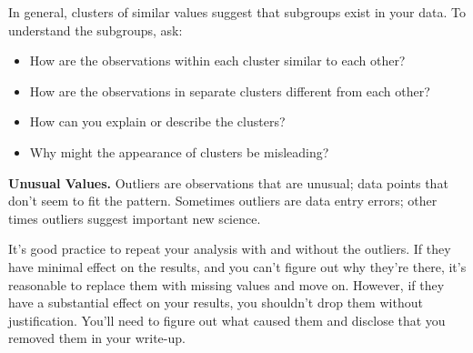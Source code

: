 \documentclass{article}
\begin{document}
In general, clusters of similar values suggest that subgroups exist in your data. To understand the subgroups, ask:

\begin{itemize}
	\item How are the observations within each cluster similar to each other?
	\item How are the observations in separate clusters different from each other?
	\item How can you explain or describe the clusters?
	\item Why might the appearance of clusters be misleading?
\end{itemize}

\textbf{Unusual Values.} Outliers are observations that are unusual; data points that don’t seem to fit the pattern. Sometimes outliers are data entry errors; other times outliers suggest important new science.

It’s good practice to repeat your analysis with and without the outliers. If they have minimal effect on the results, and you can’t figure out why they’re there, it’s reasonable to replace them with missing values and move on. However, if they have a substantial effect on your results, you shouldn’t drop them without justification. You’ll need to figure out what caused them and disclose that you removed them in your write-up.
\end{document}
